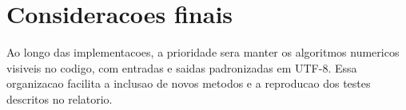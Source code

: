 \documentclass[../main.tex]{subfiles}
\begin{document}
\section{Consideracoes finais}

Ao longo das implementacoes, a prioridade sera manter os algoritmos numericos
visiveis no codigo, com entradas e saidas padronizadas em UTF-8. Essa
organizacao facilita a inclusao de novos metodos e a reproducao dos testes
descritos no relatorio.
\end{document}

